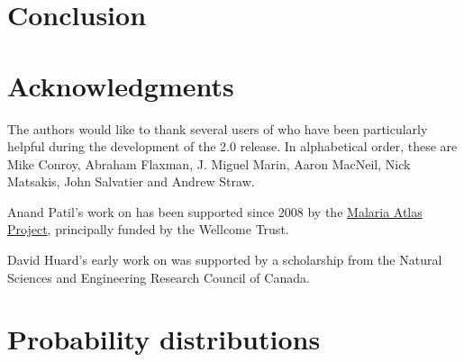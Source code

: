 \documentclass[]{jss_mod}
\begin{document}
\section{Conclusion}
\label{conclusion}


\section[Acknowledgments]{Acknowledgments}
\label{chap:acknowledge}
The authors would like to thank several users of  who have been particularly helpful during the development of the 2.0 release. In alphabetical order, these are Mike Conroy, Abraham Flaxman, J. Miguel Marin, Aaron MacNeil, Nick Matsakis, John Salvatier and Andrew Straw.

Anand Patil's work on  has been supported since 2008 by the \href{http://www.map.ox.ac.uk}{Malaria Atlas
Project}, principally funded by the Wellcome Trust.

David Huard's early work on  was supported by a scholarship from the Natural Sciences and Engineering Research Council of Canada. 
\newpage
\appendix
% 

\section[Distributions]{Probability distributions}
\label{chap:distributions}

\newpage

\nocite{Bernardo:1992fk}
\nocite{r} 
\nocite{jags} 
\nocite{winbugs}
\nocite{hbc} 

\end{document}
